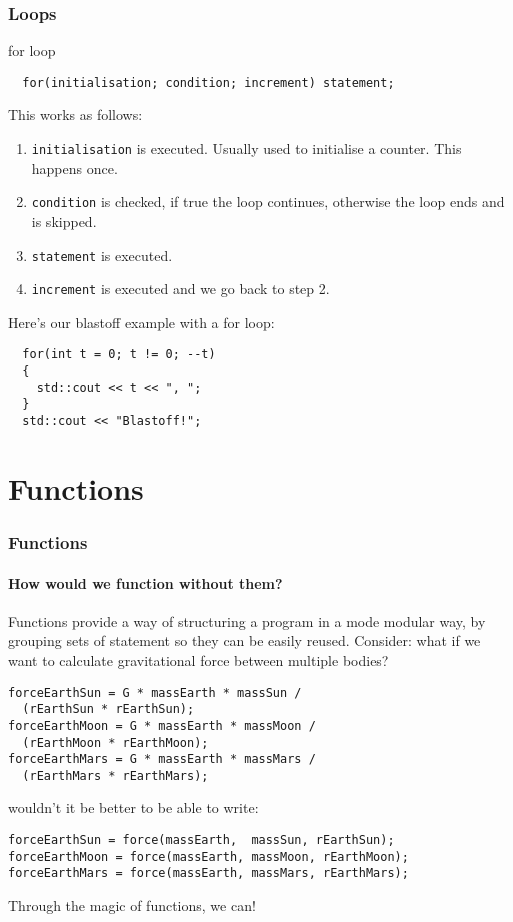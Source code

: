 \documentclass{beamer}
\begin{document}
\begin{frame}[fragile]
  \frametitle{Loops}
  
  \begin{block}{for loop}
    \begin{lstlisting}
  for(initialisation; condition; increment) statement;
    \end{lstlisting}
    This works as follows:
    \begin{enumerate}
      \item<2->{\texttt{initialisation} is executed.  Usually used to initialise a counter.  This happens once.}
      \item<3->{\texttt{condition} is checked, if true the loop continues, otherwise the loop ends and is skipped.}
      \item<4->{\texttt{statement} is executed.}
      \item<5->{\texttt{increment} is executed and we go back to step 2.}
    \end{enumerate}
    \pause[6]
    Here's our blastoff example with a for loop:
    \begin{lstlisting}
  for(int t = 0; t != 0; --t)
  {
    std::cout << t << ", ";
  }
  std::cout << "Blastoff!";
    \end{lstlisting}
    
  \end{block}
\end{frame}

\section{Functions}

\begin{frame}[fragile]
  \frametitle{Functions}
  \framesubtitle{How would we function without them?}
  Functions provide a way of structuring a program in a mode modular way, by grouping sets of statement so they can be easily reused.\newline
  \pause
  Consider: what if we want to calculate gravitational force between multiple bodies?
  \begin{lstlisting}
forceEarthSun = G * massEarth * massSun /
  (rEarthSun * rEarthSun);
forceEarthMoon = G * massEarth * massMoon /
  (rEarthMoon * rEarthMoon);
forceEarthMars = G * massEarth * massMars /
  (rEarthMars * rEarthMars);
  \end{lstlisting}
  \pause
  wouldn't it be better to be able to write:
  \begin{lstlisting}
forceEarthSun = force(massEarth,  massSun, rEarthSun);
forceEarthMoon = force(massEarth, massMoon, rEarthMoon);
forceEarthMars = force(massEarth, massMars, rEarthMars);
  \end{lstlisting}
  Through the magic of functions, we can!
\end{frame}
\end{document}
